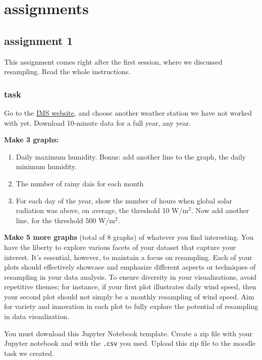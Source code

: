 \documentclass[
  letterpaper,
  DIV=11,
  numbers=noendperiod,
  oneside]{scrreprt}
\providecommand{\tightlist}{%
  \setlength{\itemsep}{0pt}\setlength{\parskip}{0pt}}\usepackage{longtable,booktabs,array}
\begin{document}
\part{assignments}

\hypertarget{assignment-1}{%
\chapter{assignment 1}\label{assignment-1}}

This assignment comes right after the first session, where we discussed
resampling. Read the whole instructions.

\hypertarget{task}{%
\section{task}\label{task}}

Go to the \href{https://ims.gov.il/en/data_gov}{IMS website}, and choose
another weather station we have not worked with yet. Download 10-minute
data for a full year, any year.

\textbf{Make 3 graphs:}

\begin{enumerate}
\def\labelenumi{\arabic{enumi}.}
\tightlist
\item
  Daily maximum humidity. Bonus: add another line to the graph, the
  daily minimum humidity.
\item
  The number of rainy dais for each month
\item
  For each day of the year, show the number of hours when global solar
  radiation was above, on average, the threshold 10 W/m\(^2\). Now add
  another line, for the threshold 500 W/m\(^2\).
\end{enumerate}

\textbf{Make 5 more graphs} (total of 8 graphs) of whatever you find
interesting. You have the liberty to explore various facets of your
dataset that capture your interest. It's essential, however, to maintain
a focus on resampling. Each of your plots should effectively showcase
and emphasize different aspects or techniques of resampling in your data
analysis. To ensure diversity in your visualizations, avoid repetitive
themes; for instance, if your first plot illustrates daily wind speed,
then your second plot should not simply be a monthly resampling of wind
speed. Aim for variety and innovation in each plot to fully explore the
potential of resampling in data visualization.

You must download this Jupyter Notebook template. Create a zip file with
your Jupyter notebook and with the \texttt{.csv} you used. Upload this
zip file to the moodle task we created.
\end{document}
